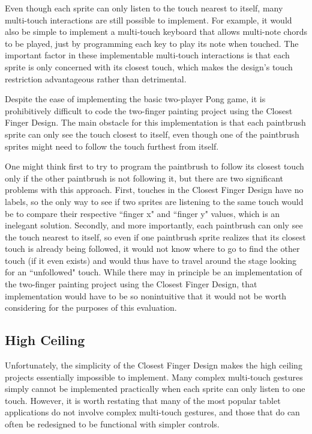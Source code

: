 Even though each sprite can only listen to the touch nearest to itself, many multi-touch interactions are still possible to implement. For example, it would also be simple to implement a multi-touch keyboard that allows multi-note chords to be played, just by programming each key to play its note when touched. The important factor in these implementable multi-touch interactions is that each sprite is only concerned with its closest touch, which makes the design's touch restriction advantageous rather than detrimental.

Despite the ease of implementing the basic two-player Pong game, it is prohibitively difficult to code the two-finger painting project using the Closest Finger Design. The main obstacle for this implementation is that each paintbrush sprite can only see the touch closest to itself, even though one of the paintbrush sprites might need to follow the touch furthest from itself. 

One might think first to try to program the paintbrush to follow its closest touch only if the other paintbrush is not following it, but there are two significant problems with this approach. First, touches in the Closest Finger Design have no labels, so the only way to see if two sprites are listening to the same touch would be to compare their respective ``finger x" and ``finger y" values, which is an inelegant solution. Secondly, and more importantly, each paintbrush can only see the touch nearest to itself, so even if one paintbrush sprite realizes that its closest touch is already being followed, it would not know where to go to find the other touch (if it even exists) and would thus have to travel around the stage looking for an ``unfollowed" touch. While there may in principle be an implementation of the two-finger painting project using the Closest Finger Design, that implementation would have to be so nonintuitive that it would not be worth considering for the purposes of this evaluation.

\subsection{High Ceiling}

Unfortunately, the simplicity of the Closest Finger Design makes the high ceiling projects essentially impossible to implement. Many complex multi-touch gestures simply cannot be implemented practically when each sprite can only listen to one touch. However, it is worth restating that many of the most popular tablet applications do not involve complex multi-touch gestures, and those that do can often be redesigned to be functional with simpler controls.

